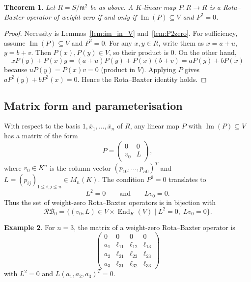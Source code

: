 \documentclass[a4paper,11pt]{elsarticle}
\newtheorem{theorem}{Theorem}[section]
\theoremstyle{definition}
\newtheorem{example}[theorem]{Example}
\theoremstyle{remark}
\DeclareMathOperator{\End}{End}
\DeclareMathOperator{\im}{Im}
\newcommand{\m}{\mathfrak{m}}
\begin{document}
\begin{theorem}\label{thm:wt0}
Let $R = S/\m^2$ be as above.  A $K$-linear map $P : R \to R$ is a Rota--Baxter operator of weight zero if and only if $\im(P) \subseteq V$ and $P^2 = 0$.
\end{theorem}

\begin{proof}
Necessity is Lemmas~\ref{lem:im_in_V} and~\ref{lem:P2zero}.
For sufficiency, assume $\im(P) \subseteq V$ and $P^2 = 0$.  For any $x,y \in R$, write them as $x = a+u$, $y = b+v$.  Then $P(x), P(y) \in V$, so their product is $0$.
On the other hand,
\[
x P(y) + P(x) y = (a+u)P(y) + P(x)(b+v) = a P(y) + b P(x)
\]
because $u P(y) = P(x) v = 0$ (product in $V$).
Applying $P$ gives $a P^2(y) + b P^2(x) = 0$.  Hence the Rota--Baxter identity holds.
\end{proof}

\subsection{Matrix form and parameterisation}
With respect to the basis $1, \bar x_1,\dots,\bar x_n$ of $R$, any linear map $P$ with $\im(P) \subseteq V$ has a matrix of the form
\begin{equation}\label{Pmatrix}
P = \begin{pmatrix}
0 & 0 \\[2pt]
v_0 & L
\end{pmatrix},
\end{equation}
where $v_0 \in K^n$ is the column vector $(p_{10},\dots,p_{n0})^T$ and $L = (p_{ij})_{1 \le i,j \le n} \in M_n(K)$.
The condition $P^2 = 0$ translates to
\[
L^2 = 0 \qquad\text{and}\qquad L v_0 = 0.
\]
Thus the set of weight‑zero Rota--Baxter operators is in bijection with
\[
\mathcal{RB}_0 = \{(v_0, L) \in V \times \End_K(V) \mid L^2 = 0,\; L v_0 = 0\}.
\]

\begin{example}\label{ex:n3}
For $n=3$, the matrix of a weight‑zero Rota--Baxter operator is
\[
\begin{pmatrix}
0 & 0 & 0 & 0\\
a_1 & \ell_{11} & \ell_{12} & \ell_{13}\\
a_2 & \ell_{21} & \ell_{22} & \ell_{23}\\
a_3 & \ell_{31} & \ell_{32} & \ell_{33}
\end{pmatrix}
\]
with $L^2 = 0$ and $L (a_1,a_2,a_3)^T = 0$.
\end{example}
\end{document}
